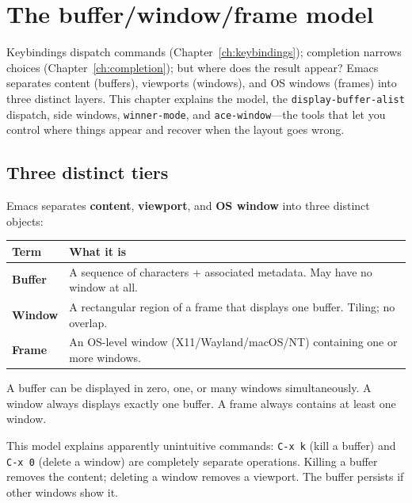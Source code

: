 \chapter{The buffer/window/frame model}
\label{ch:buffer-window-frame}
\minitoc\label{the-bufferwindowframe-model}

Keybindings dispatch commands (Chapter~\ref{ch:keybindings});
completion narrows choices (Chapter~\ref{ch:completion}); but where
does the result appear?  Emacs separates content (buffers), viewports
(windows), and OS windows (frames) into three distinct layers.  This chapter explains
the model, the \texttt{display-buffer-alist} dispatch, side windows,
\texttt{winner-mode}, and \texttt{ace-window}---the tools that let you
control where things appear and recover when the layout goes wrong.

\section{Three distinct tiers}\label{three-distinct-tiers}

Emacs separates \textbf{content}, \textbf{viewport}, and \textbf{OS window} into three distinct objects:

\begin{longtable}[]{@{}ll@{}}
\toprule
Term & What it is \\
\midrule
\textbf{Buffer} & A sequence of characters + associated metadata. May have no window at all. \\
\textbf{Window} & A rectangular region of a frame that displays one buffer. Tiling; no overlap. \\
\textbf{Frame} & An OS-level window (X11/Wayland/macOS/NT) containing one or more windows. \\
\bottomrule
\end{longtable}

A buffer can be displayed in zero, one, or many windows simultaneously. A window always displays exactly one buffer. A frame always contains at least one window.

This model explains apparently unintuitive commands: \texttt{C-x k} (kill a buffer) and \texttt{C-x 0} (delete a window) are completely separate operations. Killing a buffer removes the content; deleting a window removes a viewport. The buffer persists if other windows show it.

